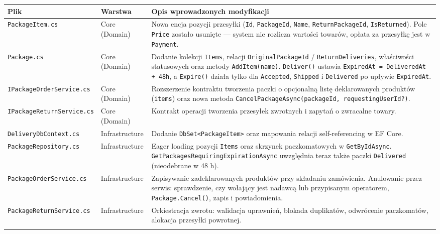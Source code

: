 \documentclass[10.5pt,a4paper]{article}
\begin{document}
\begin{table}[h!]
\centering
\footnotesize
\begin{tabularx}{\textwidth}{l p{3.0cm} X}
\toprule
\textbf{Plik} & \textbf{Warstwa} & \textbf{Opis wprowadzonych modyfikacji} \\
\midrule
\texttt{PackageItem.cs} & Core (Domain) & Nowa encja pozycji przesyłki (\texttt{Id}, \texttt{PackageId}, \texttt{Name}, \texttt{ReturnPackageId}, \texttt{IsReturned}). Pole \texttt{Price} zostało usunięte --- system nie rozlicza wartości towarów, opłata za przesyłkę jest w \texttt{Payment}. \\
\addlinespace
\texttt{Package.cs} & Core (Domain) & Dodanie kolekcji \texttt{Items}, relacji \texttt{OriginalPackageId} / \texttt{ReturnDeliveries}, właściwości statusowych oraz metody \texttt{AddItem(name)}. \texttt{Deliver()} ustawia \texttt{ExpiredAt = DeliveredAt + 48h}, a \texttt{Expire()} działa tylko dla \texttt{Accepted}, \texttt{Shipped} i \texttt{Delivered} po upływie \texttt{ExpiredAt}. \\
\addlinespace
\texttt{IPackageOrderService.cs} & Core (Domain) & Rozszerzenie kontraktu tworzenia paczki o opcjonalną listę deklarowanych produktów (\texttt{items}) oraz nowa metoda \texttt{CancelPackageAsync(packageId, requestingUserId?)}. \\
\addlinespace
\texttt{IPackageReturnService.cs} & Core (Domain) & Kontrakt operacji tworzenia przesyłek zwrotnych i zapytań o zwracalne towary. \\
\addlinespace
\texttt{DeliveryDbContext.cs} & Infrastructure & Dodanie \texttt{DbSet<PackageItem>} oraz mapowania relacji self-referencing w EF Core. \\
\addlinespace
\texttt{PackageRepository.cs} & Infrastructure & Eager loading pozycji \texttt{Items} oraz skrzynek paczkomatowych w \texttt{GetByIdAsync}. \texttt{GetPackagesRequiringExpirationAsync} uwzględnia teraz także paczki \texttt{Delivered} (nieodebrane w 48 h). \\
\addlinespace
\texttt{PackageOrderService.cs} & Infrastructure & Zapisywanie zadeklarowanych produktów przy składaniu zamówienia. Anulowanie przez serwis: sprawdzenie, czy wołający jest nadawcą lub przypisanym operatorem, \texttt{Package.Cancel()}, zapis i powiadomienia. \\
\addlinespace
\texttt{PackageReturnService.cs} & Infrastructure & Orkiestracja zwrotu: walidacja uprawnień, blokada duplikatów, odwrócenie paczkomatów, alokacja przesyłki powrotnej. \\
\addlinespace

\end{tabularx}
\end{table}
\end{document}
